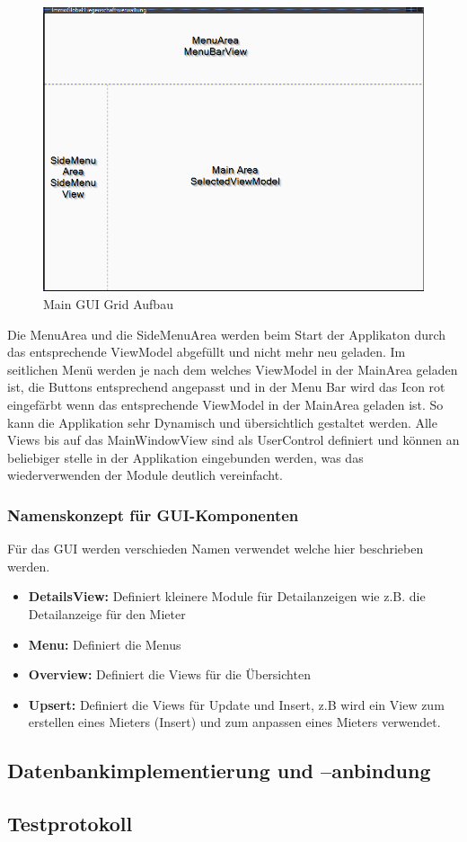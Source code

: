\begin{figure}[H]
  \begin{center}
    \includegraphics[width=0.6\linewidth]{content/images/MainGuiGrid.png}
    \caption{Main GUI Grid Aufbau}
    \label{guiGrid}
  \end{center}
\end{figure}
Die MenuArea und die SideMenuArea werden beim Start der Applikaton durch das entsprechende ViewModel abgefüllt und nicht mehr neu geladen. Im seitlichen Menü werden je nach dem welches ViewModel in der MainArea geladen ist, die Buttons entsprechend angepasst und in der Menu Bar wird das Icon rot eingefärbt wenn das entsprechende ViewModel in der MainArea geladen ist. So kann die Applikation sehr Dynamisch und übersichtlich gestaltet werden.
Alle Views bis auf das MainWindowView sind als UserControl definiert und können an beliebiger stelle in der Applikation eingebunden werden, was das wiederverwenden der Module deutlich vereinfacht.

\subsubsection{Namenskonzept für GUI-Komponenten}
Für das GUI werden verschieden Namen verwendet welche hier beschrieben werden.
\begin{itemize}
  \item \textbf{DetailsView:} Definiert kleinere Module für Detailanzeigen wie z.B. die Detailanzeige für den Mieter
  \item \textbf{Menu:} Definiert die Menus
  \item \textbf{Overview:} Definiert die Views für die Übersichten
  \item \textbf{Upsert:} Definiert die Views für Update und Insert, z.B wird ein View zum erstellen eines Mieters (Insert) und zum anpassen eines Mieters verwendet.
\end{itemize}


\subsection{Datenbankimplementierung und –anbindung}
\subsection{Testprotokoll}
